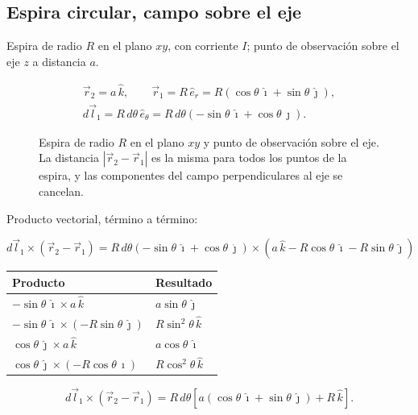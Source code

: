 \documentclass[12pt,a4paper]{article}
\begin{document}
\subsection{Espira circular, campo sobre el eje}

Espira de radio $R$ en el plano $xy$, con corriente $I$; punto de observación
sobre el eje $z$ a distancia $a$.

\[
\begin{gathered}
\vec r_2 = a\,\hat k,\qquad
\vec r_1 = R\,\hat e_r = R\left(\cos\theta\,\hat\imath + \sin\theta\,\hat\jmath\right),\\
d\vec l_1 = R\,d\theta\,\hat e_\theta = R\,d\theta\left(-\sin\theta\,\hat\imath + \cos\theta\,\hat\jmath\right).
\end{gathered}
\]

\begin{figure}[H]
  \centering
  
  \caption{Espira de radio $R$ en el plano $xy$ y punto de observación sobre el eje. La distancia $|\vec r_2-\vec r_1|$ es la misma para todos los puntos de la espira, y las componentes del campo perpendiculares al eje se cancelan.}
\end{figure}

Producto vectorial, término a término:

\[
d\vec l_1\times(\vec r_2-\vec r_1)
= R\,d\theta\left(-\sin\theta\,\hat\imath+\cos\theta\,\hat\jmath\right)\times
\left(a\,\hat k - R\cos\theta\,\hat\imath - R\sin\theta\,\hat\jmath\right)
\]

\begin{center}
\renewcommand{\arraystretch}{1.35}
\small
\begin{tabularx}{\textwidth}{>{\raggedright\arraybackslash}X>{\raggedright\arraybackslash}X}
\toprule
\textbf{Producto} & \textbf{Resultado} \\
\midrule
$-\sin\theta\,\hat\imath\times a\,\hat k$ & $a\sin\theta\,\hat\jmath$ \\
$-\sin\theta\,\hat\imath\times(-R\sin\theta\,\hat\jmath)$ & $R\sin^2\theta\,\hat k$ \\
$\cos\theta\,\hat\jmath\times a\,\hat k$ & $a\cos\theta\,\hat\imath$ \\
$\cos\theta\,\hat\jmath\times(-R\cos\theta\,\hat\imath)$ & $R\cos^2\theta\,\hat k$ \\
\bottomrule
\end{tabularx}
\end{center}

\[
d\vec l_1\times(\vec r_2-\vec r_1) = R\,d\theta\left[
a\left(\cos\theta\,\hat\imath + \sin\theta\,\hat\jmath\right) + R\,\hat k\right].
\]
\end{document}
